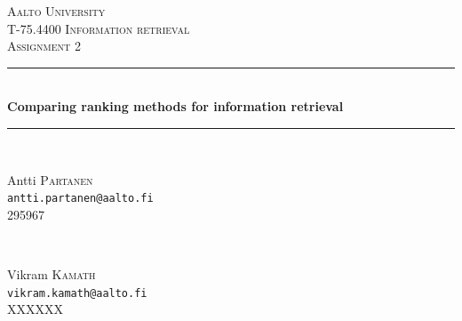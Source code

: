 \begin{titlepage}

\newcommand{\HRule}{\rule{\linewidth}{0.5mm}} %

\center %
 

\textsc{\LARGE Aalto University}\\[1.5cm] %
\textsc{\Large T-75.4400 Information retrieval}\\[0.5cm] %
\textsc{\large Assignment 2}\\[0.5cm] %


\HRule \\[0.4cm]
{ \huge \bfseries Comparing ranking methods for information retrieval}\\[0.4cm] %
\HRule \\[1.5cm]
 

\begin{minipage}{0.45\textwidth}
\begin{center} \large
Antti \textsc{Partanen}\\ %
\texttt{antti.partanen@aalto.fi}\\
295967
\end{center}
\end{minipage}
~
\begin{minipage}{0.45\textwidth}
\begin{center} \large
Vikram \textsc{Kamath}\\ %
\texttt{vikram.kamath@aalto.fi}\\
XXXXXX
\end{center}
\end{minipage}\\[2cm]



\end{titlepage}
